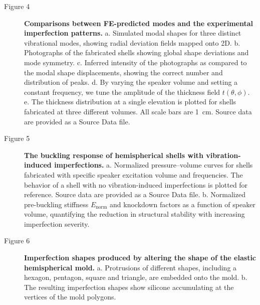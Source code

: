 \documentclass[twocolumn,letter,11pt]{article}
\begin{document}
\begin{description}
\item[Figure 4] \textbf{Comparisons between FE-predicted modes and the experimental imperfection patterns.}
a. Simulated modal shapes for three distinct vibrational modes, showing radial deviation fields mapped onto 2D. b. Photographs of the fabricated shells showing global shape deviations and mode symmetry. c. Inferred intensity of the photographs as compared to the modal shape displacements, showing the correct number and distribution of peaks. d. By varying the speaker volume and setting a constant frequency, we tune the amplitude of the thickness field $t(\theta,\phi)$. e. The thickness distribution at a single elevation is plotted for shells fabricated at three different volumes. All scale bars are \SI{1}{\centi\metre}. Source data are provided as a Source Data file.
\item[Figure 5] \textbf{The buckling response of hemispherical shells with vibration-induced imperfections.} a. Normalized pressure--volume curves for shells fabricated with specific speaker excitation volume and frequencies. The behavior of a shell with no vibration-induced imperfections is plotted for reference. Source data are provided as a Source Data file.
b. Normalized pre-buckling stiffness $E_{\mathrm{norm}}$ and knockdown factors as a function of speaker volume, quantifying the reduction in structural stability with increasing imperfection severity.
\item[Figure 6]\textbf{Imperfection shapes produced by altering the shape of the elastic hemispherical mold.} a. Protrusions of different shapes, including a hexagon, pentagon, square and triangle, are embedded onto the mold. b. The resulting imperfection shapes show silicone accumulating at the vertices of the mold polygons.
\end{description}
\end{document}
